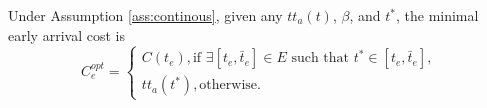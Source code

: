 \begin{prop}
  \label{prop:into-early}
 Under Assumption \ref{ass:continous}, given any $tt_a(t)$, $\beta$, and $t^*$, the minimal early arrival cost is  
$$C_e^{opt} = \begin{cases}
    C(t_e),  \text{if }\exists [t_e, \bar{t}_e] \in E \text{ such that } t^* \in [t_e, \bar{t}_e],\\
     tt_a(t^*), \text{otherwise}. 
\end{cases}$$
\end{prop}


